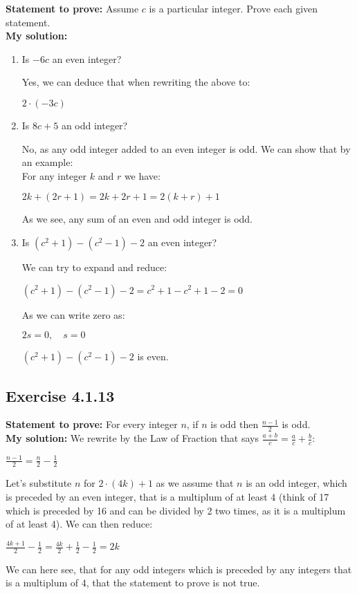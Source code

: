\documentclass{report}
\newcommand{\cent}[1]{\begin{center}#1\end{center}}
\newcommand{\Prove}{\textbf{Statement to prove: }}
\newcommand{\solution}{\textbf{My solution: }}
\newcommand{\QED}{\boxed{}}
\newcommand{\Exercise}[1]{\subsection{Exercise #1}}
\newcommand{\defaultEnumerateLabel}{\textbf{\alph*.}}
\begin{document}
	\Prove
	Assume $c$ is a particular integer. Prove each given statement.\\
	
	\solution
	\begin{enumerate}[label=\defaultEnumerateLabel]
		\item Is $-6c$ an even integer?
		
		Yes, we can deduce that when rewriting the above to:
		
		$2\cdot (-3c) $
		
		\item Is $8c+5$ an odd integer?
		
		No, as any odd integer added to an even integer is odd. We can show that by an example:\\
		
		For any integer $k$ and $r$ we have:
		\cent{$2k + (2r+1) = 2k + 2r + 1 = 2(k+r) + 1$}
		
		As we see, any sum of an even and odd integer is odd.
		
		\item Is $(c^2 + 1) - (c^2 - 1) - 2$ an even integer?
		
		We can try to expand and reduce:
		
		\cent{$(c^2 + 1) - (c^2 - 1) - 2 = c^2 + 1 - c^2 + 1 - 2 = 0$}
		
		As we can write zero as:
		
		\cent{$2s = 0, \quad s = 0$}
		
		$(c^2 + 1) - (c^2 - 1) - 2$ is even.
	\end{enumerate}
	
	\Exercise{4.1.13}
	\Prove
	For every integer $n$, if $n$ is odd then $\frac{n-1}{2}$ is odd.\\
	
	\solution
	We rewrite by the Law of Fraction that says $\frac{a+b}{c} = \frac{a}{c} + \frac{b}{c}$:
	
	\cent{$\frac{n - 1}{2} = \frac{n}{2} - \frac{1}{2}$}
	
	Let's substitute $n$ for $2\cdot (4k) + 1$ as we assume that $n$ is an odd integer, which is preceded by an even integer, that is a multiplum of at least 4 (think of 17 which is preceded by 16 and can be divided by 2 two times, as it is a multiplum of at least 4). We can then reduce:
	
	\cent{$\frac{4k +1}{2} - \frac{1}{2} = \frac{4k}{2} + \frac{1}{2} - \frac{1}{2} = 2k$}
	
	We can here see, that for any odd integers which is preceded by any integers that is a multiplum of 4, that the statement to prove is not true.\\
	\QED
	
\end{document}
